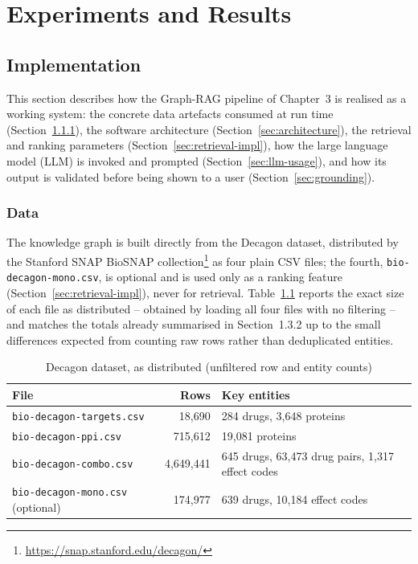 \documentclass[11pt]{report}
\begin{document}
\chapter{Experiments and Results}
\label{chap:experiments}

\section{Implementation}
\label{sec:implementation}

This section describes how the Graph-RAG pipeline of Chapter~3 is realised
as a working system: the concrete data artefacts consumed at run time
(Section~\ref{sec:data}), the software architecture
(Section~\ref{sec:architecture}), the retrieval and ranking parameters
(Section~\ref{sec:retrieval-impl}), how the large language model (LLM) is
invoked and prompted (Section~\ref{sec:llm-usage}), and how its output is
validated before being shown to a user (Section~\ref{sec:grounding}).

\subsection{Data}
\label{sec:data}

The knowledge graph is built directly from the Decagon dataset, distributed
by the Stanford SNAP BioSNAP collection\footnote{\url{https://snap.stanford.edu/decagon/}}
as four plain CSV files; the fourth, \texttt{bio-decagon-mono.csv}, is
optional and is used only as a ranking feature (Section~\ref{sec:retrieval-impl}),
never for retrieval. Table~\ref{tab:data-summary} reports the exact size of
each file as distributed -- obtained by loading all four files with no
filtering -- and matches the totals already summarised in Section~1.3.2 up
to the small differences expected from counting raw rows rather than
deduplicated entities.

\begin{table}[t]
  \caption{Decagon dataset, as distributed (unfiltered row and entity counts)}
  \label{tab:data-summary}
  \centering
  \begin{tabular}{@{}lrl@{}}
    \toprule
    File & Rows & Key entities \\
    \midrule
    \texttt{bio-decagon-targets.csv}         & 18{,}690    & 284 drugs, 3{,}648 proteins \\
    \texttt{bio-decagon-ppi.csv}             & 715{,}612   & 19{,}081 proteins \\
    \texttt{bio-decagon-combo.csv}           & 4{,}649{,}441 & 645 drugs, 63{,}473 drug pairs, 1{,}317 effect codes \\
    \texttt{bio-decagon-mono.csv} (optional) & 174{,}977   & 639 drugs, 10{,}184 effect codes \\
    \bottomrule
  \end{tabular}
\end{table}
\end{document}
